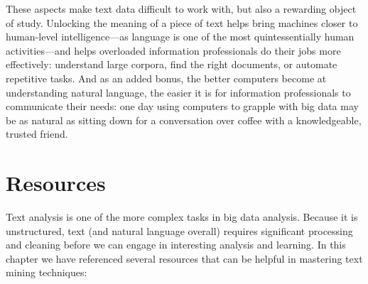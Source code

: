 \documentclass[]{krantz}
\begin{document}
These aspects make text data difficult to work with, but also a
rewarding object of study. Unlocking the meaning of a piece of text
helps bring machines closer to human-level intelligence---as language is
one of the most quintessentially human activities---and helps overloaded
information professionals do their jobs more effectively: understand
large corpora, find the right documents, or automate repetitive tasks.
And as an added bonus, the better computers become at understanding
natural language, the easier it is for information professionals to
communicate their needs: one day using computers to grapple with big
data may be as natural as sitting down for a conversation over coffee
with a knowledgeable, trusted friend.

\section{Resources}\label{resources-3}

Text analysis is one of the more complex tasks in big data analysis.
Because it is unstructured, text (and natural language overall) requires
significant processing and cleaning before we can engage in interesting
analysis and learning. In this chapter we have referenced several
resources that can be helpful in mastering text mining techniques:
\end{document}
